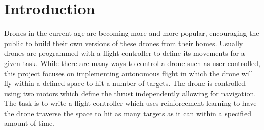 \section{Introduction}
Drones in the current age are becoming more and more popular, encouraging the public to build their own versions of these drones from their homes. Usually drones are programmed with a flight controller to define its movements for a given task. While there are many ways to control a drone such as user controlled, this project focuses on implementing autonomous flight in which the drone will fly within a defined space to hit a number of targets. The drone is controlled using two motors which define the thrust independently allowing for navigation. The task is to write a flight controller which uses reinforcement learning to have the drone traverse the space to hit as many targets as it can within a specified amount of time.
